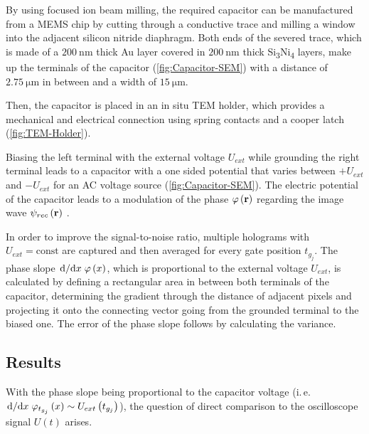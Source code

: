 By using focused ion beam milling, the required capacitor can be manufactured from a MEMS chip by cutting through a conductive trace and milling a window into the adjacent silicon nitride diaphragm. Both ends of the severed trace, which is made of a $\SI{200}{\nano\metre}$ thick Au layer covered in $\SI{200}{\nano\metre}$ thick Si\textsubscript{3}Ni\textsubscript{4} layers, make up the terminals of the capacitor (\cref{fig:Capacitor-SEM}) with a distance of $\SI{2.75}{\micro\metre}$ in between and a width of $\SI{15}{\micro\metre}$.

Then, the capacitor is placed in an in situ TEM holder, which provides a mechanical and electrical connection using spring contacts and a cooper latch (\cref{fig:TEM-Holder}).

Biasing the left terminal with the external voltage $U_{ext}$ while grounding the right terminal leads to a capacitor with a one sided potential that varies between $+U_{ext}$ and $-U_{ext}$ for an AC voltage source (\cref{fig:Capacitor-SEM}). The electric potential of the capacitor leads to a modulation of the phase $\varphi\left(\vb{r}\right)$ regarding the image wave ${\psi}_{rec}\left(\vb{r}\right)$ \cite{Niermann2017}.

In order to improve the signal-to-noise ratio, multiple holograms with $U_{ext} = \text{const}$ are captured and then averaged for every gate position $t_{g_j}$. The phase slope $\dv*{}{x} \varphi\left(x\right)$, which is proportional to the external voltage $U_{ext}$, is calculated by defining a rectangular area in between both terminals of the capacitor, determining the gradient through the distance of adjacent pixels and projecting it onto the connecting vector going from the grounded terminal to the biased one. The error of the phase slope follows by calculating the variance.
\subsection{Results} \label{ssec:application-results}
With the phase slope being proportional to the capacitor voltage (i.\,e. $\dv*{}{x} {\varphi}_{t_{g_j}}\left(x\right) \sim U_{ext}\left(t_{g_j}\right)$), the question of direct comparison to the oscilloscope signal $U\left(t\right)$ arises.

